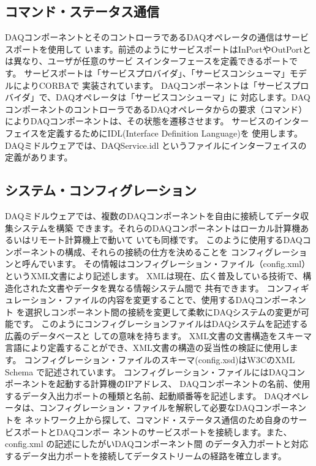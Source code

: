 \documentclass[a4j,10pt,dvips,onecolumn,oneside,final]{jarticle}%
\begin{document}
\subsection{コマンド・ステータス通信}\label{status}
DAQコンポーネントとそのコントローラであるDAQオペレータの通信はサービスポートを使用して
います。前述のようにサービスポートはInPortやOutPortとは異なり、ユーザが任意のサービ
スインターフェースを定義できるポートです。
サービスポートは「サービスプロバイダ」、「サービスコンシューマ」モデルによりCORBAで
実装されています。
DAQコンポーネントは「サービスプロバイダ」で、DAQオペレータは「サービスコンシューマ」に
対応します。DAQコンポーネントのコントローラであるDAQオペレータからの要求（コマンド）
によりDAQコンポーネントは、その状態を遷移させます。
サービスのインターフェイスを定義するためにIDL(Interface Definition Language)を
使用します。
DAQミドルウェアでは、DAQService.idl というファイルにインターフェイスの定義があります。

\subsection{システム・コンフィグレーション}\label{config}
DAQミドルウェアでは、複数のDAQコンポーネントを自由に接続してデータ収集システムを構築
できます。それらのDAQコンポーネントはローカル計算機あるいはリモート計算機上で動いて
いても同様です。
このように使用するDAQコンポーネントの構成、それらの接続の仕方を決めることを
コンフィグレーションと呼んでいます。
その情報はコンフィグレーション・ファイル（config.xml）というXML文書により記述します。
XMLは現在、広く普及している技術で、構造化された文書やデータを異なる情報システム間で
共有できます。
コンフィギュレーション・ファイルの内容を変更することで、使用するDAQコンポーネント
を選択しコンポーネント間の接続を変更して柔軟にDAQシステムの変更が可能です。
このようにコンフィグレーションファイルはDAQシステムを記述する広義のデータベースと
しての意味を持ちます。
XML文書の文書構造をスキーマ言語により定義することができ、XML文書の構造の妥当性の検証に使用します。
コンフィグレーション・ファイルのスキーマ(config.xsd)はW3CのXML Schema で記述されています。
コンフィグレーション・ファイルにはDAQコンポーネントを起動する計算機のIPアドレス、
DAQコンポーネントの名前、使用するデータ入出力ポートの種類と名前、起動順番等を記述します。
DAQオペレータは、コンフィグレーション・ファイルを解釈して必要なDAQコンポーネントを
ネットワーク上から探して、コマンド・ステータス通信のため自身のサービスポートとDAQコンポー
ネントのサービスポートを接続します。また、config.xml の記述にしたがいDAQコンポーネント間
のデータ入力ポートと対応するデータ出力ポートを接続してデータストリームの経路を確立します。
\end{document}
